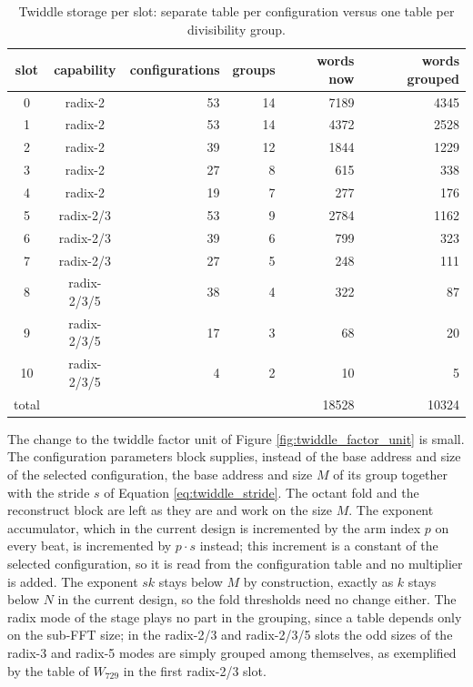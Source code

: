 \documentclass[a4paper,12pt, master]{etf}
\begin{document}
\begin{table}[H]
\centering
\caption{Twiddle storage per slot: separate table per configuration versus one table per divisibility group.}
\medskip
\label{tab:twiddle_groups}
\begin{tabular}{c c r r r r}
\hline
slot & capability & configurations & groups & words now & words grouped \\
\hline
\hline
0 & radix-2 & 53 & 14 & 7189 & 4345 \\
1 & radix-2 & 53 & 14 & 4372 & 2528 \\
2 & radix-2 & 39 & 12 & 1844 & 1229 \\
3 & radix-2 & 27 & 8 & 615 & 338 \\
4 & radix-2 & 19 & 7 & 277 & 176 \\
5 & radix-2/3 & 53 & 9 & 2784 & 1162 \\
6 & radix-2/3 & 39 & 6 & 799 & 323 \\
7 & radix-2/3 & 27 & 5 & 248 & 111 \\
8 & radix-2/3/5 & 38 & 4 & 322 & 87 \\
9 & radix-2/3/5 & 17 & 3 & 68 & 20 \\
10 & radix-2/3/5 & 4 & 2 & 10 & 5 \\
\hline
total & & & & 18528 & 10324 \\
\hline
\end{tabular}
\end{table}

The change to the twiddle factor unit of Figure \ref{fig:twiddle_factor_unit} is small. The configuration parameters block supplies, instead of the base address and size of the selected configuration, the base address and size $M$ of its group together with the stride $s$ of Equation \eqref{eq:twiddle_stride}. The octant fold and the reconstruct block are left as they are and work on the size $M$. The exponent accumulator, which in the current design is incremented by the arm index $p$ on every beat, is incremented by $p \cdot s$ instead; this increment is a constant of the selected configuration, so it is read from the configuration table and no multiplier is added. The exponent $sk$ stays below $M$ by construction, exactly as $k$ stays below $N$ in the current design, so the fold thresholds need no change either. The radix mode of the stage plays no part in the grouping, since a table depends only on the sub-FFT size; in the radix-2/3 and radix-2/3/5 slots the odd sizes of the radix-3 and radix-5 modes are simply grouped among themselves, as exemplified by the table of $W_{729}$ in the first radix-2/3 slot.
\end{document}
